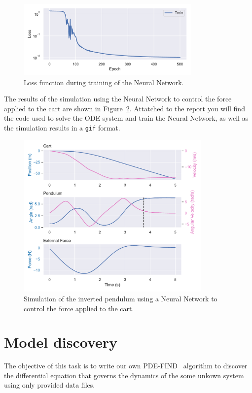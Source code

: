 \documentclass[unicode,11pt,a4paper,oneside,numbers=endperiod,openany]{scrartcl}
\begin{document}
\begin{figure}[h!]
    \hspace*{-1cm}
    \centering
    \includegraphics[width=0.8\textwidth]{../Task1/loss_function.pdf}
    \caption{Loss function during training of the Neural Network.}
    \label{fig:loss}
\end{figure}
The results of the simulation using the Neural Network to control the force
applied to the cart are shown in Figure~\ref{fig:pendulum_nn}.
Attatched to the report you will find the code used to solve the ODE system and
train the Neural Network, as well as the simulation results in a \texttt{gif} format.
\begin{figure}[h!]
    \centering
    \includegraphics[width=0.85\textwidth]{../Task1/pendulum_nn.pdf}
    \caption{Simulation of the inverted pendulum using a Neural Network to
    control the force applied to the cart.}
    \label{fig:pendulum_nn}
\end{figure}

\newpage
\section{Model discovery}\label{sec:task2}
The objective of this task is to write our own PDE-FIND~\cite{PDEFIND} algorithm to discover the
differential equation that governs the dynamics of the some unkown system using
only provided data files.
\end{document}
